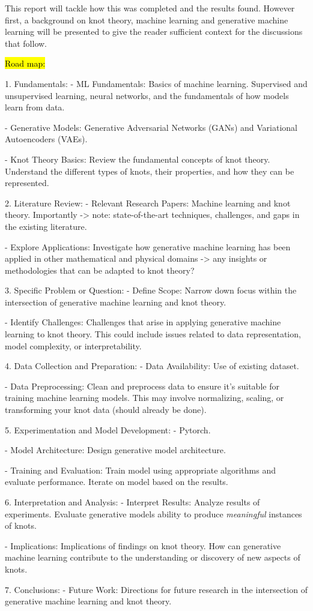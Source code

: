 This report will tackle how this was completed and the results found. 
However first, a background on knot theory, machine learning and generative machine learning will be presented to give the reader sufficient context for the discussions that follow.


\hl{Road map:}

    1. Fundamentals:
   - ML Fundamentals: Basics of machine learning. 
   Supervised and unsupervised learning, neural networks, and the fundamentals of how models learn from data.

   - Generative Models: Generative Adversarial Networks (GANs) and Variational Autoencoders (VAEs).

   - Knot Theory Basics: Review the fundamental concepts of knot theory. Understand the different types of knots, their properties, and how they can be represented.

    2. Literature Review:
   - Relevant Research Papers: Machine learning and knot theory. 
   Importantly -> note: state-of-the-art techniques, challenges, and gaps in the existing literature.

   - Explore Applications: Investigate how generative machine learning has been applied in other mathematical and physical domains -> any insights or methodologies that can be adapted to knot theory?

    3. Specific Problem or Question:
   - Define Scope: Narrow down focus within the intersection of generative machine learning and knot theory.

   - Identify Challenges: Challenges that arise in applying generative machine learning to knot theory. This could include issues related to data representation, model complexity, or interpretability.

    4. Data Collection and Preparation:
   - Data Availability: Use of existing dataset.

   - Data Preprocessing: Clean and preprocess data to ensure it's suitable for training machine learning models. This may involve normalizing, scaling, or transforming your knot data (should already be done).

    5. Experimentation and Model Development:
   - Pytorch.

   - Model Architecture: Design generative model architecture.

   - Training and Evaluation: Train model using appropriate algorithms and evaluate performance. Iterate on model based on the results.

    6. Interpretation and Analysis:
   - Interpret Results: Analyze results of experiments. Evaluate generative models ability to produce \emph{meaningful} instances of knots.

   - Implications: Implications of findings on knot theory. How can generative machine learning contribute to the understanding or discovery of new aspects of knots.

   7. Conclusions:
   - Future Work: Directions for future research in the intersection of generative machine learning and knot theory.

